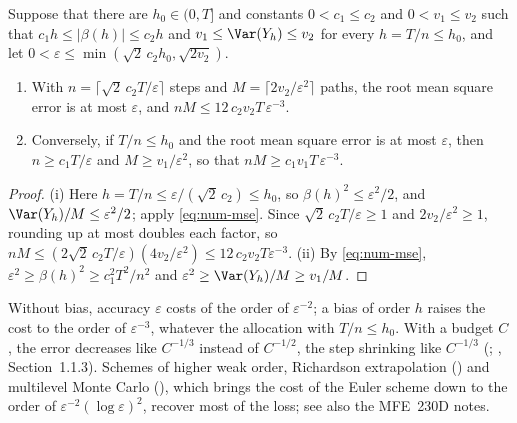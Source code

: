 \begin{proposition}\label{prop:num-mc-cost}
Suppose that there are $h_0\in(0,T]$ and constants $0<c_1\le c_2$ and $0<v_1\le v_2$ such that
$c_1h\le|\beta(h)|\le c_2h$ and $v_1\le\Var(Y_h)\le v_2$ for every $h=T/n\le h_0$, and let
$0<\varepsilon\le\min(\sqrt2\,c_2h_0,\sqrt{2v_2})$.
\begin{enumerate}[label=(\roman*)]
  \item With $n=\lceil\sqrt2\,c_2T/\varepsilon\rceil$ steps and $M=\lceil2v_2/\varepsilon^2\rceil$ paths,
    the root mean square error is at most $\varepsilon$, and $nM\le12\,c_2v_2T\,\varepsilon^{-3}$.
  \item Conversely, if $T/n\le h_0$ and the root mean square error is at most $\varepsilon$, then
    $n\ge c_1T/\varepsilon$ and $M\ge v_1/\varepsilon^2$, so that $nM\ge c_1v_1T\,\varepsilon^{-3}$.
\end{enumerate}
\end{proposition}

\begin{proof}
(i) Here $h=T/n\le\varepsilon/(\sqrt2\,c_2)\le h_0$, so $\beta(h)^2\le\varepsilon^2/2$, and
$\Var(Y_h)/M\le\varepsilon^2/2$; apply \eqref{eq:num-mse}. Since $\sqrt2\,c_2T/\varepsilon\ge1$ and
$2v_2/\varepsilon^2\ge1$, rounding up at most doubles each factor, so
$nM\le(2\sqrt2\,c_2T/\varepsilon)(4v_2/\varepsilon^2)\le12\,c_2v_2T\varepsilon^{-3}$. (ii) By
\eqref{eq:num-mse}, $\varepsilon^2\ge\beta(h)^2\ge c_1^2T^2/n^2$ and $\varepsilon^2\ge\Var(Y_h)/M\ge v_1/M$.
\end{proof}

Without bias, accuracy $\varepsilon$ costs of the order of $\varepsilon^{-2}$; a bias of order $h$ raises
the cost to the order of $\varepsilon^{-3}$, whatever the allocation with $T/n\le h_0$. With a budget $C$, the error
decreases like $C^{-1/3}$ instead of $C^{-1/2}$, the step shrinking like $C^{-1/3}$
(\textcite{duffie-glynn-1995}; \textcite{glasserman-monte-carlo}, Section~1.1.3). Schemes of higher
weak order, Richardson extrapolation () and multilevel Monte Carlo
(\textcite{giles-multilevel}), which brings the cost of the Euler scheme down to the order of
$\varepsilon^{-2}(\log\varepsilon)^2$, recover most of the loss; see also the MFE~230D notes.

